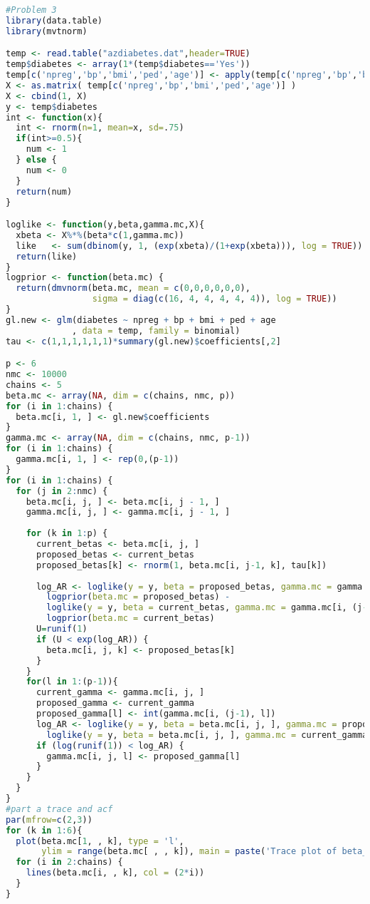 \documentclass[10pt,a4paper]{article}
\begin{document}
\begin{lstlisting}[language=R]
#Problem 3
library(data.table)
library(mvtnorm)

temp <- read.table("azdiabetes.dat",header=TRUE)
temp$diabetes <- array(1*(temp$diabetes=='Yes'))
temp[c('npreg','bp','bmi','ped','age')] <- apply(temp[c('npreg','bp','bmi','ped','age')], 2, function(x) (x - mean(x)) / sd(x))
X <- as.matrix( temp[c('npreg','bp','bmi','ped','age')] )
X <- cbind(1, X)
y <- temp$diabetes
int <- function(x){
  int <- rnorm(n=1, mean=x, sd=.75)
  if(int>=0.5){
    num <- 1
  } else {
    num <- 0
  }
  return(num)
}

loglike <- function(y,beta,gamma.mc,X){ 
  xbeta <- X%*%(beta*c(1,gamma.mc))
  like   <- sum(dbinom(y, 1, (exp(xbeta)/(1+exp(xbeta))), log = TRUE))
  return(like)
}
logprior <- function(beta.mc) {
  return(dmvnorm(beta.mc, mean = c(0,0,0,0,0,0), 
                 sigma = diag(c(16, 4, 4, 4, 4, 4)), log = TRUE))
}
gl.new <- glm(diabetes ~ npreg + bp + bmi + ped + age
             , data = temp, family = binomial)
tau <- c(1,1,1,1,1,1)*summary(gl.new)$coefficients[,2]

p <- 6
nmc <- 10000
chains <- 5
beta.mc <- array(NA, dim = c(chains, nmc, p))
for (i in 1:chains) {
  beta.mc[i, 1, ] <- gl.new$coefficients
}
gamma.mc <- array(NA, dim = c(chains, nmc, p-1))
for (i in 1:chains) {
  gamma.mc[i, 1, ] <- rep(0,(p-1))
}
for (i in 1:chains) {
  for (j in 2:nmc) {
    beta.mc[i, j, ] <- beta.mc[i, j - 1, ]
    gamma.mc[i, j, ] <- gamma.mc[i, j - 1, ]
    
    for (k in 1:p) {
      current_betas <- beta.mc[i, j, ]
      proposed_betas <- current_betas
      proposed_betas[k] <- rnorm(1, beta.mc[i, j-1, k], tau[k])
      
      log_AR <- loglike(y = y, beta = proposed_betas, gamma.mc = gamma.mc[i, (j-1), ], X = X) + 
        logprior(beta.mc = proposed_betas) -
        loglike(y = y, beta = current_betas, gamma.mc = gamma.mc[i, (j-1), ], X = X) -
        logprior(beta.mc = current_betas)
      U=runif(1)
      if (U < exp(log_AR)) {
        beta.mc[i, j, k] <- proposed_betas[k]
      }
    }
    for(l in 1:(p-1)){
      current_gamma <- gamma.mc[i, j, ]
      proposed_gamma <- current_gamma
      proposed_gamma[l] <- int(gamma.mc[i, (j-1), l])
      log_AR <- loglike(y = y, beta = beta.mc[i, j, ], gamma.mc = proposed_gamma, X = X) -
        loglike(y = y, beta = beta.mc[i, j, ], gamma.mc = current_gamma, X = X) 
      if (log(runif(1)) < log_AR) {
        gamma.mc[i, j, l] <- proposed_gamma[l]
      }
    }
  }
} 
#part a trace and acf
par(mfrow=c(2,3))
for (k in 1:6){
  plot(beta.mc[1, , k], type = 'l',
       ylim = range(beta.mc[ , , k]), main = paste('Trace plot of beta_',k-1))
  for (i in 2:chains) {
    lines(beta.mc[i, , k], col = (2*i))
  }
}


\end{lstlisting}
\end{document}
